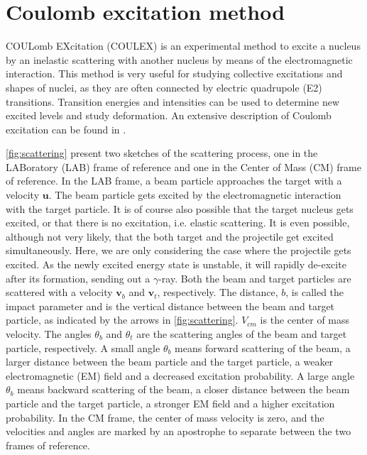 \documentclass[twoside,english]{uiofysmaster/uiofysmaster}
\newcommand{\ga}{$\gamma$}
\let\orgautoref\autoref
\renewcommand{\autoref}
        {%
		 \def\sectionautorefname{Section}%
		 \def\subsectionautorefname{Section}%
		 \def\subsubsectionautorefname{Section}%
		 \def\chapterautorefname{Chapter}%
          \orgautoref}
\begin{document}
\section{Coulomb excitation method}\label{sec:Coulex}
COULomb EXcitation (COULEX) is an experimental method to excite a nucleus by an inelastic scattering with another nucleus by means of the electromagnetic interaction. 
This method is very useful for studying collective excitations and shapes of nuclei, as they are often connected by electric quadrupole (E2) transitions.  
Transition energies and intensities can be used to determine new excited levels and study deformation.
An extensive description of Coulomb excitation can be found in \cite{Alder1956, EE-Coulex, Bertulani2009}.

\autoref{fig:scattering} present two sketches of the scattering process, one in the LABoratory (LAB) frame of reference and one in the Center of Mass (CM) frame of reference. 
In the LAB frame, a beam particle approaches the target with a velocity $\mathbf{u}$.
The beam particle gets excited by the electromagnetic interaction with the target particle. 
It is of course also possible that the target nucleus gets excited, or that there is no excitation, i.e. elastic scattering. 
It is even possible, although not very likely, that the both target and the projectile get excited simultaneously.
Here, we are only considering the case where the projectile gets excited.
As the newly excited energy state is unstable, it will rapidly de-excite after its formation, sending out a \ga-ray. 
Both the beam and target particles are scattered with a velocity $\mathbf{v}_b$ and $\mathbf{v}_t$, respectively.
The distance, $b$, is called the impact parameter and is the vertical distance between the beam and target particle, as indicated by the arrows in \autoref{fig:scattering}. 
$V_{cm}$ is the center of mass velocity. 
The angles $\theta_b$ and $\theta_t$ are the scattering angles of the beam and target particle, respectively. 
A small angle $\theta_b$ means forward scattering of the beam, a larger distance between the beam particle and the target particle, a weaker electromagnetic (EM) field and a decreased excitation probability. 
A large angle $\theta_b$ means backward scattering of the beam, a closer distance between the beam particle and the target particle, a stronger EM field and a higher excitation probability.
In the CM frame, the center of mass velocity is zero, and the velocities and angles are marked by an apostrophe to separate between the two frames of reference.
\end{document}
